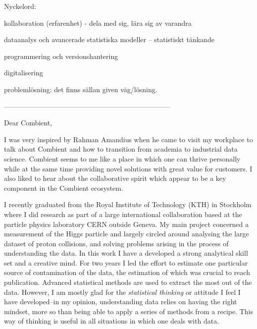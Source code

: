 \documentclass[11pt, a4paper]{../awesome-cv} %
\begin{document}
\sloppy %

\makecvheader %

\makelettertitle %


\begin{cvletter}
\vspace{.2cm}

Nyckelord: 

kollaboration (erfarenhet) - dela med sig, lära sig av varandra

dataanalys och avancerade statistiska modeller -- statistiskt tänkande

programmering och versionshantering

digitalisering 

problemlösning: det finns sällan given väg/lösning. 

------------------------------------------------------------------------

Dear Combient,

I was very inspired by Rahman Amandius when he came to visit my workplace to talk about Combient and how to transition from academia to industrial data science.
Combient seems to me like a place in which one can thrive personally while at the same time providing novel solutions with great value for customers.
I also liked to hear about the collaborative spirit which appear to be a key component in the Combient ecosystem.

I recently graduated from the Royal Institute of Technology (KTH) in Stockholm where I did research as part of a large international collaboration based at the particle physics laboratory CERN outside Geneva.
My main project concerned a measurement of the Higgs particle and largely circled around analysing the large dataset of proton collisions, and solving problems arising in the process of understanding the data.
In this work I have a developed a strong analytical skill set and a creative mind. 
For two years I led the effort to estimate one particular source of contamination of the data, the estimation of which was crucial to reach publication. 
Advanced statistical methods are used to extract the most out of the data.
However, I am mostly glad for the {\it statistical thinking} or attitude I feel I have developed--in my opinion, understanding data relies on having the right mindset, more so than being able to apply a series of methods from a recipe.
This way of thinking is useful in all situations in which one deals with data.


\end{cvletter}
\end{document}

